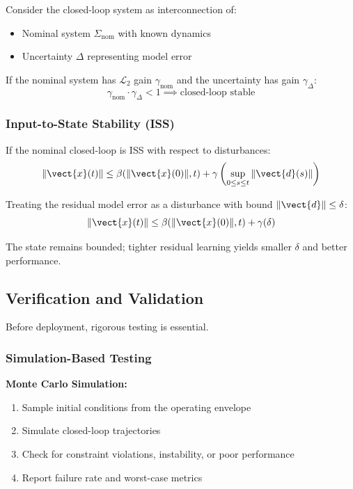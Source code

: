 Consider the closed-loop system as interconnection of:
\begin{itemize}
    \item Nominal system $\Sigma_{\text{nom}}$ with known dynamics
    \item Uncertainty $\Delta$ representing model error
\end{itemize}

If the nominal system has $\mathcal{L}_2$ gain $\gamma_{\text{nom}}$ and the uncertainty has gain $\gamma_\Delta$:
\begin{equation}
\gamma_{\text{nom}} \cdot \gamma_\Delta < 1 \implies \text{closed-loop stable}
\label{eq:small_gain}
\end{equation}

\subsubsection{Input-to-State Stability (ISS)}

If the nominal closed-loop is ISS with respect to disturbances:
\begin{equation}
\|\vect{x}(t)\| \leq \beta(\|\vect{x}(0)\|, t) + \gamma\left(\sup_{0 \leq s \leq t} \|\vect{d}(s)\|\right)
\label{eq:iss_bound}
\end{equation}

Treating the residual model error as a disturbance with bound $\|\vect{d}\| \leq \delta$:
\begin{equation}
\|\vect{x}(t)\| \leq \beta(\|\vect{x}(0)\|, t) + \gamma(\delta)
\end{equation}

The state remains bounded; tighter residual learning yields smaller $\delta$ and better performance.

\subsection{Verification and Validation}

Before deployment, rigorous testing is essential.

\subsubsection{Simulation-Based Testing}

\textbf{Monte Carlo Simulation:}
\begin{enumerate}
    \item Sample initial conditions from the operating envelope
    \item Simulate closed-loop trajectories
    \item Check for constraint violations, instability, or poor performance
    \item Report failure rate and worst-case metrics
\end{enumerate}

